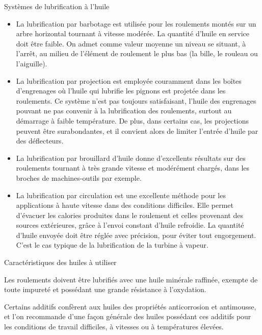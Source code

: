 Systèmes de lubrification à l'huile
\vspace{0.3cm}
\begin{itemize}
 
\item La lubrification par barbotage est utilisée pour les roulements montés sur un arbre horizontal tournant à vitesse modérée. La quantité d’huile en service doit être faible. On admet comme valeur moyenne un niveau se situant, à l’arrêt, au milieu de l’élément de roulement le plus bas (la bille, le rouleau ou l’aiguille).

\item La lubrification par projection est employée couramment dans les boîtes d’engrenages où l’huile qui lubrifie les pignons est projetée dans les roulements. Ce système n’est pas toujours satisfaisant, l’huile des engrenages pouvant ne pas convenir à la lubrification des roulements, surtout au démarrage à faible température. De plus, dans certains cas, les projections peuvent être surabondantes, et il convient alors de limiter l’entrée d’huile par des déflecteurs.

\item La lubrification par brouillard d’huile donne d’excellents résultats sur des roulements tournant à très grande vitesse et modérément chargés, dans les broches de machines-outils par exemple.

\item La lubrification par circulation est une excellente méthode pour les applications à haute vitesse dans des conditions difficiles. Elle permet d’évacuer les calories produites dans le roulement et celles provenant des sources extérieures, grâce à l’envoi constant d’huile refroidie. La quantité d’huile envoyée doit être réglée avec précision, pour éviter tout engorgement. C’est le cas typique de la lubrification de la turbine à vapeur.

  
\end{itemize}

\vspace{0.3cm}
Caractéristiques des huiles à utiliser
\vspace{0.3cm}

Les roulements doivent être lubrifiés avec une huile minérale raffinée, exempte de toute impureté et possédant une grande résistance à l’oxydation.
\vspace{0.3cm}

Certains additifs confèrent aux huiles des propriétés anticorrosion et antimousse, et l’on recommande d’une façon générale des huiles possédant ces additifs pour les conditions de travail difficiles, à vitesses ou à températures élevées.
\vspace{0.3cm}

